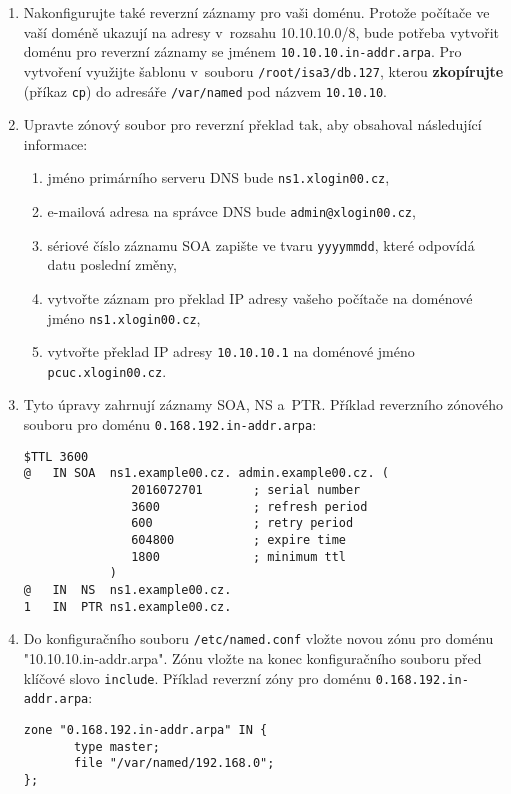\documentclass[a4paper,11pt]{article}
\begin{document}
\begin{enumerate}
  \item Nakonfigurujte také reverzní záznamy pro vaši doménu. Protože počítače ve vaší doméně ukazují na adresy v~rozsahu 10.10.10.0/8, bude potřeba vytvořit doménu pro reverzní záznamy se jménem \texttt{10.10.10.in-addr.arpa}. Pro vytvoření využijte šablonu v~souboru {\tt /root/isa3/db.127}, kterou \textbf{zkopírujte} (příkaz \texttt{cp}) do adresáře {\tt /var/named} pod názvem {\tt 10.10.10}.
  \item Upravte zónový soubor pro reverzní překlad tak, aby obsahoval následující informace:
    \begin{enumerate}
      \item jméno primárního serveru DNS bude {\tt ns1.xlogin00.cz},
      \item e-mailová adresa na správce DNS bude {\tt admin@xlogin00.cz},
      \item sériové číslo záznamu SOA zapište ve tvaru {\tt yyyymmdd}, které odpovídá datu poslední změny,
      \item vytvořte záznam pro překlad IP adresy vašeho počítače na doménové jméno {\tt ns1.xlogin00.cz},
      \item vytvořte překlad IP adresy {\tt 10.10.10.1} na doménové jméno {\tt pcuc.xlogin00.cz}.
    \end{enumerate}
  \item Tyto úpravy zahrnují záznamy SOA, NS a~PTR. Příklad reverzního zónového souboru pro doménu {\tt 0.168.192.in-addr.arpa}:
    \vspace{-3mm}
\begin{verbatim}
$TTL 3600
@   IN SOA  ns1.example00.cz. admin.example00.cz. (
               2016072701       ; serial number
               3600             ; refresh period
               600              ; retry period
               604800           ; expire time
               1800             ; minimum ttl
            )
@   IN  NS  ns1.example00.cz.
1   IN  PTR ns1.example00.cz.
\end{verbatim}
  \enlargethispage{2mm}
\item Do konfiguračního souboru {\tt /etc/named.conf} vložte novou zónu pro doménu "10.10.10.in-addr.arpa". Zónu vložte na konec konfiguračního souboru před klíčové slovo {\tt include}. Příklad reverzní zóny pro doménu {\tt 0.168.192.in-addr.arpa}:
\begin{verbatim}
zone "0.168.192.in-addr.arpa" IN {
       type master;
       file "/var/named/192.168.0";
};
\end{verbatim}



\end{enumerate}
\end{document}
